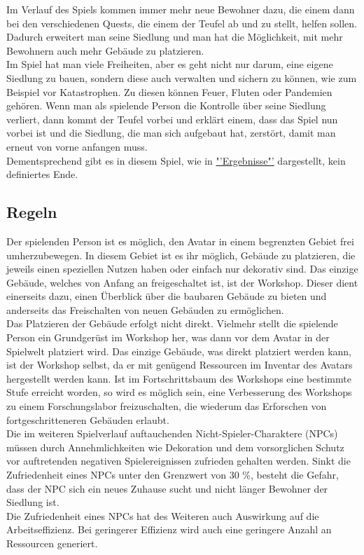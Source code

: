 \documentclass[paper=A4,pagesize=auto,12pt,headinclude=true,footinclude=true,BCOR=0mm,DIV=calc]{scrartcl}
\newcommand{\sectionspace}{
	\vspace{0.5cm}
}
\begin{document}
Im Verlauf des Spiels kommen immer mehr neue Bewohner dazu, die einem dann bei den verschiedenen Quests, die einem der Teufel ab und zu stellt, helfen sollen. Dadurch erweitert man seine Siedlung und man hat die Möglichkeit, mit mehr Bewohnern auch mehr Gebäude zu platzieren. \\
Im Spiel hat man viele Freiheiten, aber es geht nicht nur darum, eine eigene Siedlung zu bauen, sondern diese auch verwalten und sichern zu können, wie zum Beispiel vor Katastrophen. Zu diesen können Feuer, Fluten oder Pandemien gehören. Wenn man als spielende Person die Kontrolle über seine Siedlung verliert, dann kommt der Teufel vorbei und erklärt einem, dass das Spiel nun vorbei ist und die Siedlung, die man sich aufgebaut hat, zerstört, damit man erneut von vorne anfangen muss. \\
Dementsprechend gibt es in diesem Spiel, wie in \hyperref[sec:Ergebnisse]{"'Ergebnisse"'} dargestellt, kein definiertes Ende. %


\sectionspace
\subsection{Regeln}\label{sec:Regeln}
Der spielenden Person ist es möglich, den Avatar in einem begrenzten Gebiet frei umherzubewegen. In diesem Gebiet ist es ihr möglich, Gebäude zu platzieren, die jeweils einen speziellen Nutzen haben oder einfach nur dekorativ sind. Das einzige Gebäude, welches von Anfang an freigeschaltet ist, ist der Workshop. Dieser dient einerseits dazu, einen Überblick über die baubaren Gebäude zu bieten und anderseits das Freischalten von neuen Gebäuden zu ermöglichen. \\
Das Platzieren der Gebäude erfolgt nicht direkt. Vielmehr stellt die spielende Person ein Grundgerüst im Workshop her, was dann vor dem Avatar in der Spielwelt platziert wird. Das einzige Gebäude, was direkt platziert werden kann, ist der Workshop selbst, da er mit genügend Ressourcen im Inventar des Avatars hergestellt werden kann.
Ist im Fortschrittsbaum des Workshops eine bestimmte Stufe erreicht worden, so wird es möglich sein, eine Verbesserung des Workshops zu einem Forschungslabor freizuschalten, die wiederum das Erforschen von fortgeschritteneren Gebäuden erlaubt. \\
Die im weiteren Spielverlauf auftauchenden Nicht-Spieler-Charaktere (NPCs) müssen durch Annehmlichkeiten wie Dekoration und dem vorsorglichen Schutz vor auftretenden negativen Spielereignissen zufrieden gehalten werden. Sinkt die Zufriedenheit eines NPCs unter den Grenzwert von 30 \%, besteht die Gefahr, dass der NPC sich ein neues Zuhause sucht und nicht länger Bewohner der Siedlung ist. \\ %
Die Zufriedenheit eines NPCs hat des Weiteren auch Auswirkung auf die Arbeitseffizienz. Bei geringerer Effizienz wird auch eine geringere Anzahl an Ressourcen generiert.
\end{document}
